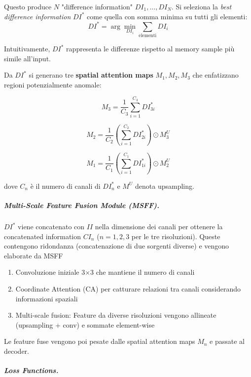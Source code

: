Questo produce $N$ "difference information" $DI_1, \dots, DI_N$. Si seleziona la \textit{best difference information} $DI^*$ come quella con somma minima su tutti gli elementi:
\begin{equation}
DI^* = \arg\min_{DI_i} \sum_{\text{elementi}} DI_i
\end{equation}

Intuitivamente, $DI^*$ rappresenta le differenze rispetto al memory sample più simile all'input.

Da $DI^*$ si generano tre \textbf{spatial attention maps} $M_1, M_2, M_3$ che enfatizzano regioni potenzialmente anomale:

\begin{equation}
M_3 = \frac{1}{C_3} \sum_{i=1}^{C_3} DI^*_{3i}
\end{equation}

\begin{equation}
M_2 = \frac{1}{C_2} \left(\sum_{i=1}^{C_2} DI^*_{2i}\right) \odot M_3^U
\end{equation}

\begin{equation}
M_1 = \frac{1}{C_1} \left(\sum_{i=1}^{C_1} DI^*_{1i}\right) \odot M_2^U
\end{equation}

dove $C_n$ è il numero di canali di $DI^*_n$ e $M^U$ denota upsampling. 

\subparagraph{Multi-Scale Feature Fusion Module (MSFF).}

$DI^*$ viene concatenato con $II$ nella dimensione dei canali per ottenere la concatenated information $CI_n$ ($n=1,2,3$ per le tre risoluzioni). Queste contengono ridondanza (concatenazione di due sorgenti diverse) e vengono elaborate da MSFF

\begin{enumerate}
\item Convoluzione iniziale 3×3 che mantiene il numero di canali
\item Coordinate Attention (CA) \cite{hou2021coordinate} per catturare relazioni tra canali considerando informazioni spaziali
\item Multi-scale fusion: Feature da diverse risoluzioni vengono allineate (upsampling + conv) e sommate element-wise
\end{enumerate}

Le feature fuse vengono poi pesate dalle spatial attention maps $M_n$ e passate al decoder.

\subparagraph{Loss Functions.}

